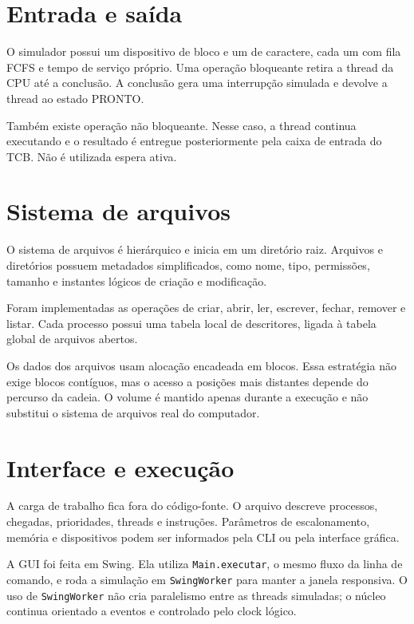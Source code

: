 \documentclass[11pt,a4paper]{article}
\begin{document}
\section{Entrada e saída}

O simulador possui um dispositivo de bloco e um de caractere, cada um com fila FCFS e tempo de serviço próprio. Uma operação bloqueante retira a thread da CPU até a conclusão. A conclusão gera uma interrupção simulada e devolve a thread ao estado PRONTO.

Também existe operação não bloqueante. Nesse caso, a thread continua executando e o resultado é entregue posteriormente pela caixa de entrada do TCB. Não é utilizada espera ativa.

\section{Sistema de arquivos}

O sistema de arquivos é hierárquico e inicia em um diretório raiz. Arquivos e diretórios possuem metadados simplificados, como nome, tipo, permissões, tamanho e instantes lógicos de criação e modificação.

Foram implementadas as operações de criar, abrir, ler, escrever, fechar, remover e listar. Cada processo possui uma tabela local de descritores, ligada à tabela global de arquivos abertos.

Os dados dos arquivos usam alocação encadeada em blocos. Essa estratégia não exige blocos contíguos, mas o acesso a posições mais distantes depende do percurso da cadeia. O volume é mantido apenas durante a execução e não substitui o sistema de arquivos real do computador.

\section{Interface e execução}

A carga de trabalho fica fora do código-fonte. O arquivo descreve processos, chegadas, prioridades, threads e instruções. Parâmetros de escalonamento, memória e dispositivos podem ser informados pela CLI ou pela interface gráfica.

A GUI foi feita em Swing. Ela utiliza \texttt{Main.executar}, o mesmo fluxo da linha de comando, e roda a simulação em \texttt{SwingWorker} para manter a janela responsiva. O uso de \texttt{SwingWorker} não cria paralelismo entre as threads simuladas; o núcleo continua orientado a eventos e controlado pelo clock lógico.
\end{document}
